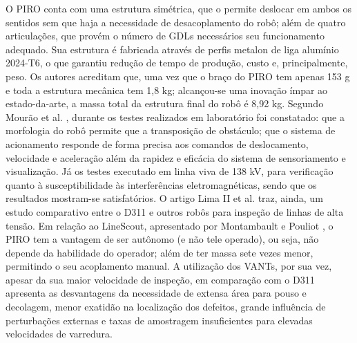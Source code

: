 O PIRO conta com uma estrutura simétrica, que o permite deslocar em ambos os sentidos sem que haja a necessidade de desacoplamento do robô; além de quatro articulações, que provém o número de GDLs necessários seu funcionamento adequado. Sua estrutura é fabricada através de perfis metalon de liga alumínio 2024-T6, o que garantiu redução de tempo de produção, custo e, principalmente, peso. Os autores acreditam que, uma vez que o braço do PIRO tem apenas 153 g e toda a estrutura mecânica tem 1,8 kg; alcançou-se uma inovação ímpar ao estado-da-arte, a massa total da estrutura final do robô é 8,92 kg.
Segundo Mourão et al. \cite{mourao2015robolinhas}, durante os testes realizados em laboratório foi constatado: que a morfologia do robô permite que a transposição de obstáculo; que o sistema de acionamento responde de forma precisa aos comandos de deslocamento, velocidade e aceleração além da rapidez e eficácia do sistema de sensoriamento e visualização. Já os testes executado em linha viva de 138 kV, para verificação quanto à susceptibilidade às interferências eletromagnéticas, sendo que os resultados mostram-se satisfatórios. 
O artigo Lima II et al. \cite{iirobo} traz, ainda, um estudo comparativo entre o D311 e outros robôs para inspeção de linhas de alta tensão. Em relação ao LineScout, apresentado por Montambault e Pouliot \cite{montambault2007design} , o PIRO tem a vantagem de ser autônomo (e não tele operado), ou seja, não depende da habilidade do operador; além de ter massa sete vezes menor, permitindo o seu acoplamento manual. A utilização dos VANTs, por sua vez, apesar da sua maior velocidade de inspeção, em comparação com o D311 apresenta as desvantagens da necessidade de extensa área para pouso e decolagem, menor exatidão na localização dos defeitos, grande influência de perturbações externas e taxas de amostragem insuficientes para elevadas velocidades de varredura.

